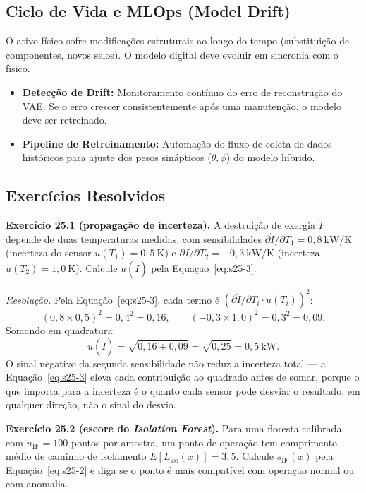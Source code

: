 \documentclass[12pt,a4paper]{article}
\numberwithin{equation}{section}
\numberwithin{table}{section}
\numberwithin{figure}{section}
\begin{document}
{	\subsection{Ciclo de Vida e MLOps (Model Drift)}
	O ativo físico sofre modificações estruturais ao longo do tempo (substituição de componentes, novos selos). O modelo digital deve evoluir em sincronia com o físico.
	\begin{itemize}
		\item \textbf{Detecção de Drift:} Monitoramento contínuo do erro de reconstrução do VAE. Se o erro crescer consistentemente após uma manutenção, o modelo deve ser retreinado.
		\item \textbf{Pipeline de Retreinamento:} Automação do fluxo de coleta de dados históricos para ajuste dos pesos sinápticos ($\theta, \phi$) do modelo híbrido.
	\end{itemize}

	\subsection{Exercícios Resolvidos}

	\textbf{Exercício 25.1 (propagação de incerteza).} A destruição de
	exergia $\dot{I}$ depende de duas temperaturas medidas, com
	sensibilidades $\partial \dot{I}/\partial T_1 = 0{,}8\ \mathrm{kW/K}$
	(incerteza do sensor $u(T_1)=0{,}5\ \mathrm{K}$) e
	$\partial \dot{I}/\partial T_2 = -0{,}3\ \mathrm{kW/K}$ (incerteza
	$u(T_2)=1{,}0\ \mathrm{K}$). Calcule $u(\dot{I})$ pela
	Equação~\eqref{eq:s25-3}.

	\emph{Resolução.} Pela Equação~\eqref{eq:s25-3}, cada termo é
	$(\partial \dot{I}/\partial T_i \cdotp u(T_i))^2$:
	$$(0{,}8 \times 0{,}5)^2 = 0{,}4^2 = 0{,}16, \qquad
	(-0{,}3 \times 1{,}0)^2 = 0{,}3^2 = 0{,}09.$$
	Somando em quadratura:
	$$u(\dot{I}) = \sqrt{0{,}16+0{,}09} = \sqrt{0{,}25} = 0{,}5\
	\mathrm{kW}.$$
	O sinal negativo da segunda sensibilidade não reduz a incerteza total
	--- a Equação~\eqref{eq:s25-3} eleva cada contribuição ao quadrado
	antes de somar, porque o que importa para a incerteza é o quanto cada
	sensor pode desviar o resultado, em qualquer direção, não o sinal do
	desvio.

	\textbf{Exercício 25.2 (escore do \textit{Isolation Forest}).} Para
	uma floresta calibrada com $n_{\text{IF}}=100$ pontos por amostra, um
	ponto de operação tem comprimento médio de caminho de isolamento
	$E[L_{\text{iso}}(x)] = 3{,}5$. Calcule $s_{\text{IF}}(x)$ pela
	Equação~\eqref{eq:s25-2} e diga se o ponto é mais compatível com
	operação normal ou com anomalia.

}
\end{document}
